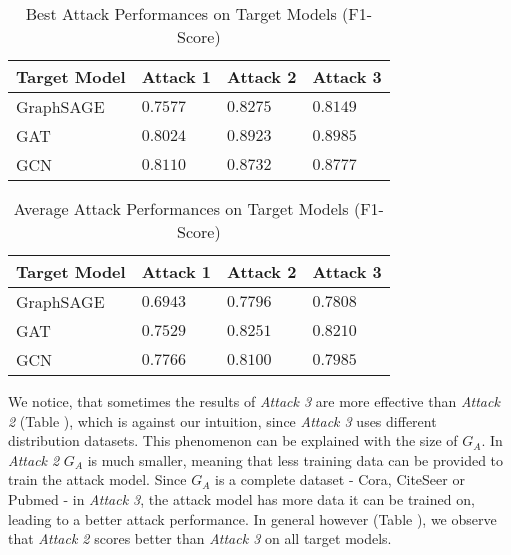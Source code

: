         \vspace{0.48cm}
        \begin{table}[!h]
            \centering
            \footnotesize
            \begin{tabular}{l|l|l|l|}
                \toprule
                Target Model & Attack 1 & Attack 2 & Attack 3 \\
                \midrule
                GraphSAGE & $0.7577$ & $0.8275$ & $0.8149$ \\
                GAT & $0.8024$ & $0.8923$ & $0.8985$ \\
                GCN & $0.8110$ & $0.8732$ & $0.8777$ \\
                
                \bottomrule
            \end{tabular}
            \caption{Best Attack Performances on Target Models (F1-Score)}
            \label{table:attack-best-results-all}
          \end{table}
        
        \vspace{0.48cm}
        \begin{table}[!h]
            \centering
            \footnotesize
            \begin{tabular}{l|l|l|l|}
                \toprule
                Target Model & Attack 1 & Attack 2 & Attack 3 \\
                \midrule
                GraphSAGE & $0.6943$ & $0.7796$ & $0.7808$ \\
                GAT & $0.7529$ & $0.8251$ & $0.8210$ \\
                GCN & $0.7766$ & $0.8100$ & $0.7985$ \\
                
                \bottomrule
            \end{tabular}
            \caption{Average Attack Performances on Target Models (F1-Score)}
            \label{table:attack-avg-results-all}
        \end{table}
    
    We notice, that sometimes the results of \emph{Attack 3} are more effective than \emph{Attack 2} (Table ), which is against our intuition, since \emph{Attack 3} uses different distribution datasets.
    This phenomenon can be explained with the size of $G_A$.
    In \emph{Attack 2} $G_A$ is much smaller, meaning that less training data can be provided to train the attack model.
    Since $G_A$ is a complete dataset - Cora, CiteSeer or Pubmed - in \emph{Attack 3}, the attack model has more data it can be trained on, leading to a better attack performance.
    In general however (Table ), we observe that \emph{Attack 2} scores better than \emph{Attack 3} on all target models.

